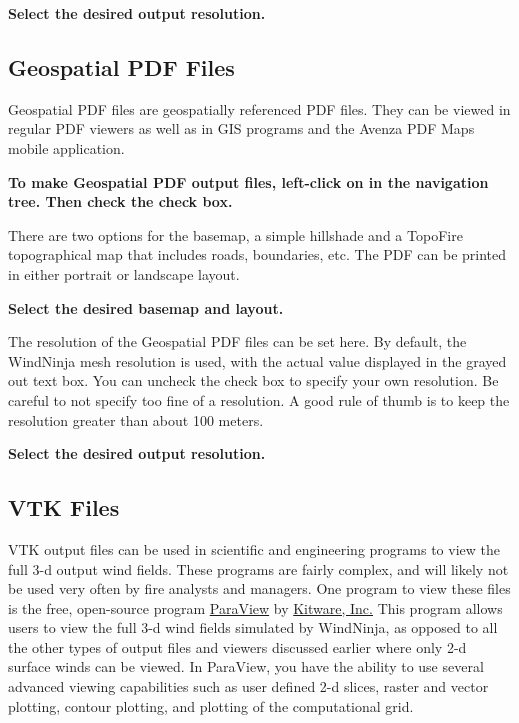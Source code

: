 \documentclass[12pt]{article}
\begin{document}
\textbf{\color{red} Select the desired output resolution.}

\subsection{Geospatial PDF Files}

Geospatial PDF files are geospatially referenced PDF files. 
They can be viewed in regular PDF viewers as well as in GIS programs and the Avenza PDF Maps mobile application. 

\textbf{\color{red} To make Geospatial PDF output files, left-click on  in the navigation tree.  
Then check the  check box.}

There are two options for the basemap, a simple hillshade and a TopoFire topographical map that includes roads, boundaries, etc. 
The PDF can be printed in either portrait or landscape layout.

\textbf{\color{red} Select the desired basemap and layout.}

The resolution of the Geospatial PDF files can be set here. 
By default, the WindNinja mesh resolution is used, with the actual value displayed in the grayed out text box.  
You can uncheck the  check box to specify your own resolution.  
Be careful to not specify too fine of a resolution.  
A good rule of thumb is to keep the resolution greater than about 100 meters.

\textbf{\color{red} Select the desired output resolution.}

\subsection{VTK Files}

VTK output files can be used in scientific and engineering programs to view the full 3-d output wind fields.  
These programs are fairly complex, and will likely not be used very often by fire analysts and managers.  
One program to view these files is the free, open-source program \href{http://www.paraview.org/}{ParaView} by \href{http://www.kitware.com/}{Kitware, Inc.}  
This program allows users to view the full 3-d wind fields simulated by WindNinja, as opposed to all the other types of output files and viewers discussed earlier where only 2-d surface winds can be viewed.  
In ParaView, you have the ability to use several advanced viewing capabilities such as user defined 2-d slices, raster and vector plotting, contour plotting, and plotting of the computational grid.
\end{document}
